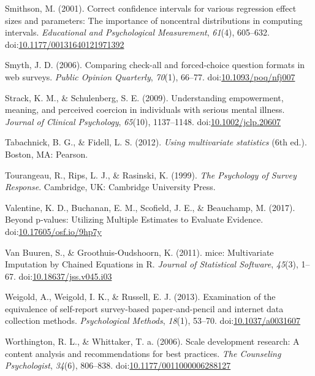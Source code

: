 \documentclass[english,man, mask]{apa6}
\theoremstyle{definition}
\theoremstyle{definition}
\theoremstyle{definition}
\theoremstyle{remark}
\begin{document}
\hypertarget{ref-Smithson2001}{}
Smithson, M. (2001). Correct confidence intervals for various regression
effect sizes and parameters: The importance of noncentral distributions
in computing intervals. \emph{Educational and Psychological
Measurement}, \emph{61}(4), 605--632.
doi:\href{https://doi.org/10.1177/00131640121971392}{10.1177/00131640121971392}

\hypertarget{ref-Smyth2006}{}
Smyth, J. D. (2006). Comparing check-all and forced-choice question
formats in web surveys. \emph{Public Opinion Quarterly}, \emph{70}(1),
66--77.
doi:\href{https://doi.org/10.1093/poq/nfj007}{10.1093/poq/nfj007}

\hypertarget{ref-Strack2009}{}
Strack, K. M., \& Schulenberg, S. E. (2009). Understanding empowerment,
meaning, and perceived coercion in individuals with serious mental
illness. \emph{Journal of Clinical Psychology}, \emph{65}(10),
1137--1148.
doi:\href{https://doi.org/10.1002/jclp.20607}{10.1002/jclp.20607}

\hypertarget{ref-Tabachnick2012}{}
Tabachnick, B. G., \& Fidell, L. S. (2012). \emph{Using multivariate
statistics} (6th ed.). Boston, MA: Pearson.

\hypertarget{ref-Tourangeau1999}{}
Tourangeau, R., Rips, L. J., \& Rasinski, K. (1999). \emph{The
Psychology of Survey Response}. Cambridge, UK: Cambridge University
Press.

\hypertarget{ref-Valentine2017}{}
Valentine, K. D., Buchanan, E. M., Scofield, J. E., \& Beauchamp, M.
(2017). Beyond p-values: Utilizing Multiple Estimates to Evaluate
Evidence.
doi:\href{https://doi.org/10.17605/osf.io/9hp7y}{10.17605/osf.io/9hp7y}

\hypertarget{ref-VanBuuren2011}{}
Van Buuren, S., \& Groothuis-Oudshoorn, K. (2011). mice: Multivariate
Imputation by Chained Equations in R. \emph{Journal of Statistical
Software}, \emph{45}(3), 1--67.
doi:\href{https://doi.org/10.18637/jss.v045.i03}{10.18637/jss.v045.i03}

\hypertarget{ref-Weigold2013}{}
Weigold, A., Weigold, I. K., \& Russell, E. J. (2013). Examination of
the equivalence of self-report survey-based paper-and-pencil and
internet data collection methods. \emph{Psychological Methods},
\emph{18}(1), 53--70.
doi:\href{https://doi.org/10.1037/a0031607}{10.1037/a0031607}

\hypertarget{ref-Worthington2006}{}
Worthington, R. L., \& Whittaker, T. a. (2006). Scale development
research: A content analysis and recommendations for best practices.
\emph{The Counseling Psychologist}, \emph{34}(6), 806--838.
doi:\href{https://doi.org/10.1177/0011000006288127}{10.1177/0011000006288127}
\end{document}
